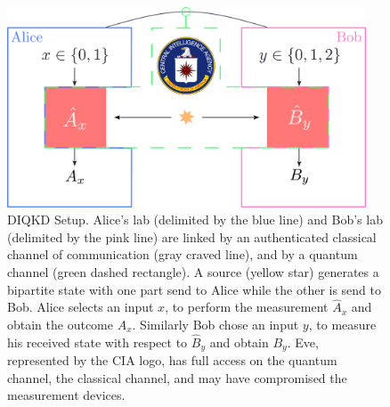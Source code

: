 \begin{figure}
	\begin{center}
		\includegraphics[width=0.95\textwidth]{chapters/deviceindependent/img/setup.pdf}
	\end{center}
	\caption{DIQKD Setup. Alice's lab (delimited by the blue line) and Bob's lab (delimited by the pink line) are linked by an authenticated classical channel of communication (gray craved line), and by a quantum channel (green dashed rectangle). A source (yellow star) generates a bipartite state with one part send to Alice while the other is send to Bob. Alice selects an input $x$, to perform the measurement $\hat{A}_x$ and obtain the outcome $A_x$. Similarly Bob chose an input $y$, to measure his
		received state with respect to $\hat{B}_y$ and obtain $B_y$.
	Eve, represented by the CIA logo, has full access on the quantum channel, the classical channel, and may have compromised the measurement devices. }
	\label{fig:DIQKD_setup}
\end{figure}

